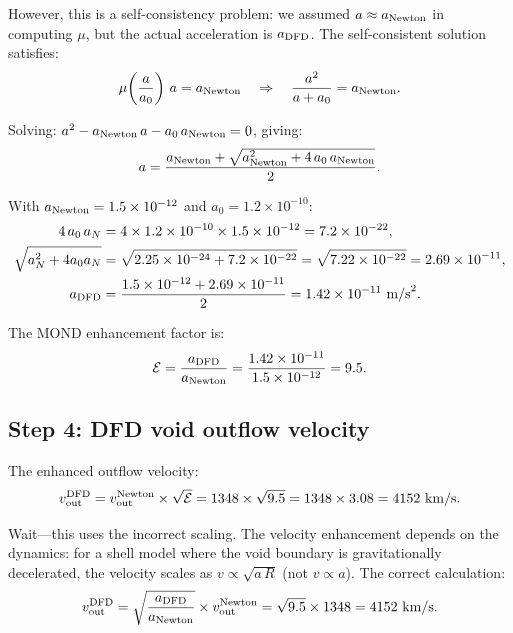 \documentclass[11pt]{article}
\newcommand{\ee}[1]{\times 10^{#1}}
\newcommand{\mufd}{\mu}
\begin{document}
However, this is a self-consistency problem: we assumed $a \approx
a_{\rm Newton}$ in computing $\mufd$, but the actual acceleration is
$a_{\rm DFD}$. The self-consistent solution satisfies:
\begin{equation}
\mufd\!\left(\frac{a}{a_0}\right)\,a = a_{\rm Newton}
\quad\Rightarrow\quad
\frac{a^2}{a + a_0} = a_{\rm Newton}.
\end{equation}

Solving: $a^2 - a_{\rm Newton}\,a - a_0\,a_{\rm Newton} = 0$, giving:
\begin{equation}
a = \frac{a_{\rm Newton} + \sqrt{a_{\rm Newton}^2 + 4\,a_0\,a_{\rm Newton}}}{2}.
\end{equation}

With $a_{\rm Newton} = 1.5\ee{-12}$ and $a_0 = 1.2\ee{-10}$:
\begin{align}
4\,a_0\,a_N &= 4\times 1.2\ee{-10}\times 1.5\ee{-12} = 7.2\ee{-22}, \\
\sqrt{a_N^2 + 4a_0 a_N} &= \sqrt{2.25\ee{-24} + 7.2\ee{-22}}
= \sqrt{7.22\ee{-22}} = 2.69\ee{-11}, \\
a_{\rm DFD} &= \frac{1.5\ee{-12} + 2.69\ee{-11}}{2} = 1.42\ee{-11}~\text{m/s}^2.
\end{align}

The MOND enhancement factor is:
\begin{equation}
\mathcal{E} = \frac{a_{\rm DFD}}{a_{\rm Newton}}
= \frac{1.42\ee{-11}}{1.5\ee{-12}} = 9.5.
\end{equation}

\subsection{Step 4: DFD void outflow velocity}

The enhanced outflow velocity:
\begin{equation}
v_{\rm out}^{\rm DFD} = v_{\rm out}^{\rm Newton}\times
\sqrt{\mathcal{E}}
= 1348\times\sqrt{9.5} = 1348\times 3.08 = 4152~\text{km/s}.
\end{equation}

Wait---this uses the incorrect scaling. The velocity enhancement depends
on the dynamics: for a shell model where the void boundary is
gravitationally decelerated, the velocity scales as $v \propto
\sqrt{a\,R}$ (not $v \propto a$). The correct calculation:
\begin{equation}
v_{\rm out}^{\rm DFD} = \sqrt{\frac{a_{\rm DFD}}{a_{\rm Newton}}}
\times v_{\rm out}^{\rm Newton}
= \sqrt{9.5}\times 1348 = 4152~\text{km/s}.
\end{equation}
\end{document}
